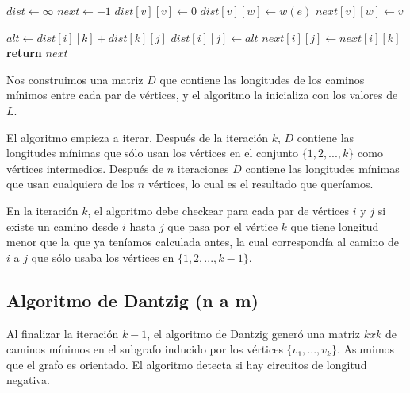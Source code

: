\begin{algorithm}
\begin{algorithmic}[1]
  \State $dist \gets \infty$
  \State $next \gets -1$
    \State $dist[v][v] \gets 0$
  \EndFor
    \State $dist[v][w] \gets w(e)$
    \State $next[v][w] \gets v$
  \EndFor

        \State $alt \gets dist[i][k] + dist[k][j]$
          \State $dist[i][j] \gets alt$
          \State $next[i][j] \gets next[i][k]$
        \EndIf
      \EndFor
    \EndFor
  \EndFor
  \State \textbf{return} $next$
\EndFunction
\end{algorithmic}
\end{algorithm}

Nos construimos una matriz $D$ que contiene las longitudes de los caminos m\'inimos entre cada par de v\'ertices, y el algoritmo la inicializa con los valores de $L$.

El algoritmo empieza a iterar. Despu\'es de la iteraci\'on $k$, $D$ contiene las longitudes m\'inimas que s\'olo usan los v\'ertices en el conjunto $\{1, 2, ..., k\}$ como v\'ertices intermedios. Despu\'es de $n$ iteraciones $D$ contiene las longitudes m\'inimas que usan cualquiera de los $n$ v\'ertices, lo cual es el resultado que quer\'iamos.

En la iteraci\'on $k$, el algoritmo debe checkear para cada par de v\'ertices $i$ y $j$ si existe un camino desde $i$ hasta $j$ que pasa por el v\'ertice $k$ que tiene longitud menor que la que ya ten\'iamos calculada antes, la cual correspond\'ia al camino de $i$ a $j$ que s\'olo usaba los v\'ertices en $\{1, 2, ..., k-1\}$.


\subsection{Algoritmo de Dantzig (n a m)}

Al finalizar la iteraci\'on $k-1$, el algoritmo de Dantzig gener\'o una matriz $k x k$ de caminos m\'inimos en el subgrafo inducido por los v\'ertices $\{v_1, ..., v_k\}$. Asumimos que el grafo es orientado. El algoritmo detecta si hay circuitos de longitud negativa.

